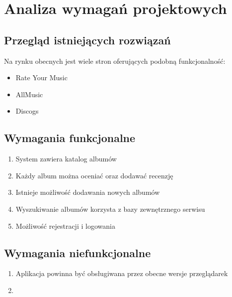 
\chapter{Analiza wymagań projektowych}

\section{Przegląd istniejących rozwiązań}
	Na rynku obecnych jest wiele stron oferujących podobną funkcjonalność:
	\begin{itemize}
		\item Rate Your Music
		\item AllMusic
		\item Discogs
	\end{itemize}

\section{Wymagania funkcjonalne}
	\begin{enumerate}
		\item System zawiera katalog albumów
		\item Każdy album można oceniać oraz dodawać recenzję
		\item Istnieje możliwość dodawania nowych albumów
		\item Wyszukiwanie albumów korzysta z bazy zewnętrznego serwisu
		\item Możliwość rejestracji i logowania
	\end{enumerate}

\section{Wymagania niefunkcjonalne}
	\begin{enumerate}
		\item Aplikacja powinna być obsługiwana przez obecne wersje przeglądarek
		\item 
	\end{enumerate}

